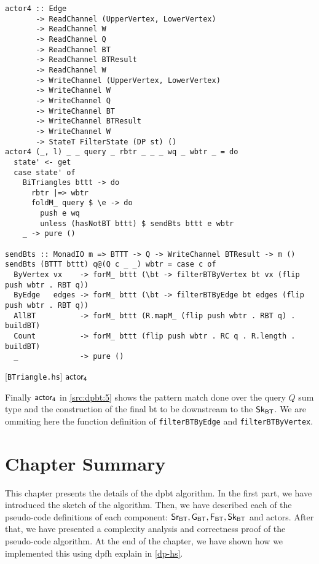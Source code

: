 \begin{listing}[H]
\begin{verbatim}            
actor4 :: Edge
       -> ReadChannel (UpperVertex, LowerVertex)
       -> ReadChannel W
       -> ReadChannel Q
       -> ReadChannel BT
       -> ReadChannel BTResult
       -> ReadChannel W
       -> WriteChannel (UpperVertex, LowerVertex)
       -> WriteChannel W
       -> WriteChannel Q
       -> WriteChannel BT
       -> WriteChannel BTResult
       -> WriteChannel W
       -> StateT FilterState (DP st) ()
actor4 (_, l) _ _ query _ rbtr _ _ _ wq _ wbtr _ = do
  state' <- get
  case state' of
    BiTriangles bttt -> do
      rbtr |=> wbtr
      foldM_ query $ \e -> do
        push e wq
        unless (hasNotBT bttt) $ sendBts bttt e wbtr
    _ -> pure ()

sendBts :: MonadIO m => BTTT -> Q -> WriteChannel BTResult -> m ()
sendBts (BTTT bttt) q@(Q c _ _) wbtr = case c of
  ByVertex vx    -> forM_ bttt (\bt -> filterBTByVertex bt vx (flip push wbtr . RBT q))
  ByEdge   edges -> forM_ bttt (\bt -> filterBTByEdge bt edges (flip push wbtr . RBT q))
  AllBT          -> forM_ bttt (R.mapM_ (flip push wbtr . RBT q) . buildBT)
  Count          -> forM_ bttt (flip push wbtr . RC q . R.length . buildBT)
  _              -> pure ()
\end{verbatim}
\caption{[\texttt{BTriangle.hs}] $\ad$}
\label{src:dpbt:5}
\end{listing}

Finally $\mathsf{actor_4}$ in \autoref{src:dpbt:5} shows the pattern match done over the query $Q$ sum type and the construction
of the final \acrshort{bt} to be downstream to the $\mathsf{Sk_{BT}}$. We are ommiting here the function definition of \texttt{filterBTByEdge}
and \texttt{filterBTByVertex}.

\section{Chapter Summary}
This chapter presents the details of the \acrshort{dpbt} algorithm. In the first part, we have introduced the sketch of the algorithm.
Then, we have described each of the pseudo-code definitions of each component: $\mathsf{Sr_{BT}}, \mathsf{G_{BT}}, \mathsf{F_{BT}}, \mathsf{Sk_{BT}}$ and actors. 
After that, we have presented a complexity analysis and correctness proof of the pseudo-code algorithm.
At the end of the chapter, we have shown how we implemented this using \acrshort{dpfh} explain in \autoref{dp-hs}.

